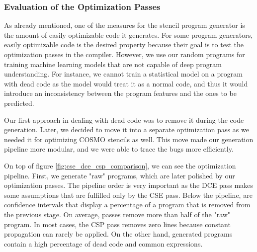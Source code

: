 \documentclass[sigplan,\review anonymous]{acmart}
\begin{document}
\subsubsection{Evaluation of the Optimization Passes}

As already mentioned, one of the measures for the stencil program generator is
the amount of easily optimizable code it generates. For some program
generators, easily optimizable code is the desired property because their goal
is to test the optimization passes in the compiler. However, we use our random
programs for training machine learning models that are not capable of deep
program understanding. For instance, we cannot train a statistical model on
a program with dead code as the model would treat it as a normal code, and thus
it would introduce an inconsistency between the program features and the ones
to be predicted.

Our first approach in dealing with dead code was to remove it during the code
generation. Later, we decided to move it into a separate optimization pass as
we needed it for optimizing COSMO stencils as well. This move made our
generation pipeline more modular, and we were able to trace the bugs more
efficiently.

On top of figure \ref{fig:cse_dce_csp_comparison}, we can see the optimization
pipeline. First, we generate "raw" programs, which are later polished by our
optimization passes. The pipeline order is very important as the DCE pass
makes some assumptions that are fulfilled only by the CSE pass. Below the
pipeline, are confidence intervals that display a percentage of a program that
is removed from the previous stage. On average, passes remove more than half
of the "raw" program. In most cases, the CSP pass removes zero lines because
constant propagation can rarely be applied. On the other hand, generated
programs contain a high percentage of dead code and common expressions.
\end{document}

